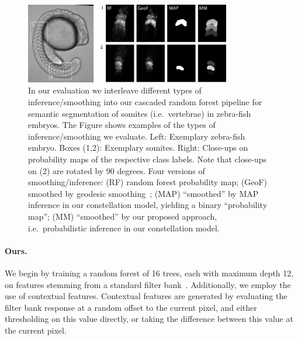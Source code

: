 \documentclass[10pt,twocolumn,letterpaper]{article}
\begin{document}
\begin{figure}[t]
\begin{center}
\includegraphics[width=0.8\textwidth]{smoothing.jpg} %
\caption{In our evaluation we interleave different types of inference/smoothing into our cascaded random forest pipeline for semantic segmentation of somites (i.e.\ vertebrae) in zebra-fish embryos. 
%
The Figure shows examples of the types of inference/smoothing we evaluate. 
Left: Exemplary zebra-fish embryo. Boxes (1,2): Exemplary somites. Right: Close-ups on probability maps of the respective class labels. Note that close-ups on (2) are rotated by 90 degrees. 
%
Four versions of smoothing/inference: (RF) random forest probability map; (GeoF) smoothed by geodesic smoothing~\cite{GeoForests2013}; (MAP) ``smoothed'' by MAP inference in our constellation model, yielding a binary ``probability map''; 
%
(MM) ``smoothed'' by our proposed approach, i.e.\ probabilistic inference in our constellation model.  }
\label{fig:smoothing}
\end{center}
\end{figure}
%


\paragraph{Ours. }

We begin by training a random forest of 16 trees, each with maximum depth 12, on features stemming from a standard filter bank~\cite{hall2009weka}.  Additionally, we employ the use of contextual features. 
Contextual features are generated by evaluating the filter bank response at a random offset to the current pixel, and either thresholding on this value directly, or taking the difference between this value at the current pixel.  
\end{document}
